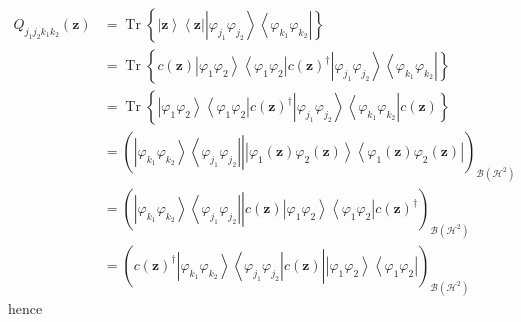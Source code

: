 \documentclass[aps,preprint]{revtex4}%
\begin{document}
\begin{align}
Q_{j_{1}j_{2}k_{1}k_{2}}\left(  \mathbf{z}\right)   &  =\operatorname*{Tr}%
\left\{  \left\vert \mathbf{z}\right\rangle \left\langle \mathbf{z}\right\vert
\left\vert \varphi_{j_{1}}\varphi_{j_{2}}\right\rangle \left\langle
\varphi_{k_{1}}\varphi_{k_{2}}\right\vert \right\}  \nonumber\\
&  =\operatorname*{Tr}\left\{  c\left(  \mathbf{z}\right)  \left\vert
\varphi_{1}\varphi_{2}\right\rangle \left\langle \varphi_{1}\varphi
_{2}\right\vert c\left(  \mathbf{z}\right)  ^{\dagger}\left\vert
\varphi_{j_{1}}\varphi_{j_{2}}\right\rangle \left\langle \varphi_{k_{1}%
}\varphi_{k_{2}}\right\vert \right\}  \nonumber\\
&  =\operatorname*{Tr}\left\{  \left\vert \varphi_{1}\varphi_{2}\right\rangle
\left\langle \varphi_{1}\varphi_{2}\right\vert c\left(  \mathbf{z}\right)
^{\dagger}\left\vert \varphi_{j_{1}}\varphi_{j_{2}}\right\rangle \left\langle
\varphi_{k_{1}}\varphi_{k_{2}}\right\vert c\left(  \mathbf{z}\right)
\right\}  \nonumber\\
&  =\left(  \left.  \overset{}{\left\vert \varphi_{k_{1}}\varphi_{k_{2}%
}\right\rangle \left\langle \varphi_{j_{1}}\varphi_{j_{2}}\right\vert
}\right\vert \left\vert \varphi_{1}\left(  \mathbf{z}\right)  \varphi
_{2}\left(  \mathbf{z}\right)  \right\rangle \left\langle \varphi_{1}\left(
\mathbf{z}\right)  \varphi_{2}\left(  \mathbf{z}\right)  \right\vert \right)
_{\mathcal{B}\left(  \mathcal{H}^{2}\right)  }\nonumber\\
&  =\left(  \left.  \overset{}{\left\vert \varphi_{k_{1}}\varphi_{k_{2}%
}\right\rangle \left\langle \varphi_{j_{1}}\varphi_{j_{2}}\right\vert
}\right\vert c\left(  \mathbf{z}\right)  \left\vert \varphi_{1}\varphi
_{2}\right\rangle \left\langle \varphi_{1}\varphi_{2}\right\vert c\left(
\mathbf{z}\right)  ^{\dagger}\right)  _{\mathcal{B}\left(  \mathcal{H}%
^{2}\right)  }\nonumber\\
&  =\left(  \left.  c\left(  \mathbf{z}\right)  ^{\dagger}%
\overset{}{\left\vert \varphi_{k_{1}}\varphi_{k_{2}}\right\rangle \left\langle
\varphi_{j_{1}}\varphi_{j_{2}}\right\vert }c\left(  \mathbf{z}\right)
\right\vert \left\vert \varphi_{1}\varphi_{2}\right\rangle \left\langle
\varphi_{1}\varphi_{2}\right\vert \right)  _{\mathcal{B}\left(  \mathcal{H}%
^{2}\right)  }%
\end{align}
hence
\end{document}
